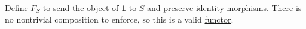 Define $F_S$ to send the object of \textbf{1} to $S$ and preserve identity morphisms. There is no nontrivial composition to enforce, so this is a valid \href{doc/1 math/Seven Sketches in Compositionality/Chapter 3: Databases/3 Functors, natural transformations, and databases/2 Functors/1 Functor}{functor}.
